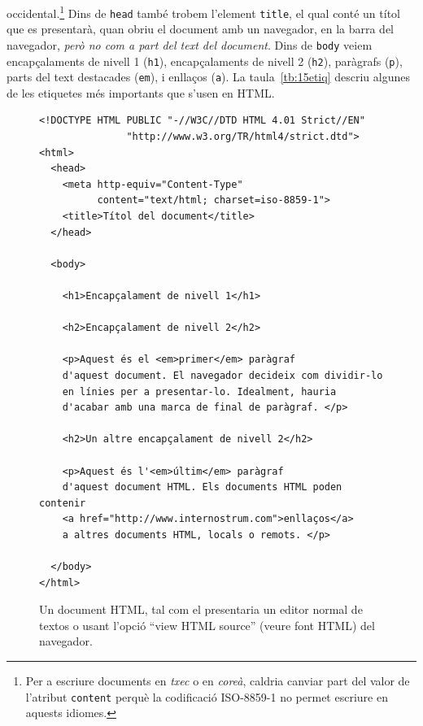 occidental.\footnote{Per a escriure documents en \emph{txec} o en
  \emph{coreà}, caldria canviar part del valor de l'atribut
  \texttt{content} perquè la codificació ISO-8859-1 no permet escriure
  en aquests idiomes.} Dins de \texttt{head} també trobem l'element
\texttt{title}, el qual conté un títol que es presentarà, quan obriu
el document amb un navegador, en la barra del navegador, \emph{però no
  com a part del text del document}. Dins de \texttt{body} veiem
encapçalaments de nivell 1 (\texttt{h1}), encapçalaments de nivell 2
(\texttt{h2}), paràgrafs (\texttt{p}), parts del text destacades
(\texttt{em}), i enllaços (\texttt{a}). La taula~\ref{tb:15etiq} descriu algunes de les etiquetes més importants que s'usen en HTML.

\begin{figure}
\begin{center}
\begin{verbatim}
<!DOCTYPE HTML PUBLIC "-//W3C//DTD HTML 4.01 Strict//EN"
               "http://www.w3.org/TR/html4/strict.dtd">
<html>
  <head>
    <meta http-equiv="Content-Type"
          content="text/html; charset=iso-8859-1">
    <title>Títol del document</title>
  </head>

  <body>

    <h1>Encapçalament de nivell 1</h1>

    <h2>Encapçalament de nivell 2</h2>

    <p>Aquest és el <em>primer</em> paràgraf 
    d'aquest document. El navegador decideix com dividir-lo 
    en línies per a presentar-lo. Idealment, hauria 
    d'acabar amb una marca de final de paràgraf. </p>

    <h2>Un altre encapçalament de nivell 2</h2>

    <p>Aquest és l'<em>últim</em> paràgraf 
    d'aquest document HTML. Els documents HTML poden contenir 
    <a href="http://www.internostrum.com">enllaços</a> 
    a altres documents HTML, locals o remots. </p>

  </body>
</html>
\end{verbatim}
\end{center}
\caption{Un document HTML, tal com el presentaria un editor normal de
  textos o usant l'opció ``view HTML source'' (veure font HTML) del
  navegador. 
  }
\label{fg:HTML}
\end{figure}

